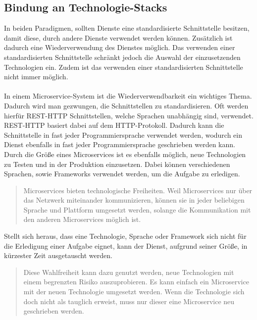 \subsection{Bindung an Technologie-Stacks}
\label{subsec:BindungAnTechnologiestacks}
In beiden Paradigmen, sollten Dienste eine standardisierte Schnittstelle besitzen, damit diese, durch andere Dienste verwendet werden können. Zusätzlich ist dadurch eine Wiederverwendung des Dienstes möglich. Das verwenden einer standardisierten Schnittstelle schränkt jedoch die Auswahl der einzusetzenden Technologien ein. Zudem ist das verwenden einer standardisierten Schnittstelle nicht immer möglich.
\\\\
In einem Microservice-System ist die Wiederverwendbarkeit ein wichtiges Thema. Dadurch wird man gezwungen, die Schnittstellen zu standardisieren. Oft werden hierfür REST-HTTP Schnittstellen, welche Sprachen unabhängig sind, verwendet. REST-HTTP basiert dabei auf dem HTTP-Protokoll. Dadurch kann die Schnittstelle in fast jeder Programmiersprache verwendet werden, wodurch ein Dienst ebenfalls in fast jeder Programmiersprache geschrieben werden kann. Durch die Größe eines Microservices ist es ebenfalls möglich, neue Technologien zu Testen und in der Produktion einzusetzen. Dabei können verschiedenen Sprachen, sowie Frameworks verwendet werden, um die Aufgabe zu erledigen. 

\begin{quotation}
	\frqq Microservices bieten technologische Freiheiten. Weil Microservices nur über das Netzwerk miteinander kommunizieren, können sie in jeder beliebigen Sprache und Plattform umgesetzt werden, solange die Kommunikation mit den anderen Microservices möglich ist.\flqq\ \cite[S. 66]{EWolff2016:Microservices}
\end{quotation}

Stellt sich heraus, dass eine Technologie, Sprache oder Framework sich nicht für die Erledigung einer Aufgabe eignet, kann der Dienst, aufgrund seiner Größe, in kürzester Zeit ausgetauscht werden.

\begin{quotation}
	\frqq Diese Wahlfreiheit kann dazu genutzt werden, neue Technologien mit einem begrenzten Risiko auszuprobieren. Es kann einfach ein Microservice mit der neuen Technologie umgesetzt werden. Wenn die Technologie sich doch nicht als tauglich erweist, muss nur dieser eine Microservice neu geschrieben werden.\flqq\ \cite[S. 66]{EWolff2016:Microservices}
\end{quotation}

